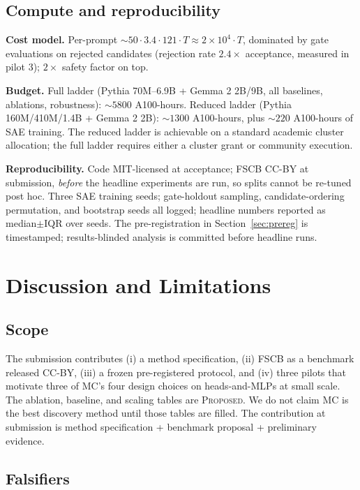 \documentclass[10pt]{article}
\begin{document}
\subsection{Compute and reproducibility}

\textbf{Cost model.} Per-prompt $\sim 50 \cdot 3.4 \cdot 121 \cdot T \approx 2 \times 10^4 \cdot T$, dominated by gate evaluations on rejected candidates (rejection rate $2.4\times$ acceptance, measured in pilot 3); $2\times$ safety factor on top.

\textbf{Budget.} Full ladder (Pythia 70M--6.9B + Gemma 2 2B/9B, all baselines, ablations, robustness): $\sim 5800$ A100-hours. Reduced ladder (Pythia 160M/410M/1.4B + Gemma 2 2B): $\sim 1300$ A100-hours, plus $\sim 220$ A100-hours of SAE training. The reduced ladder is achievable on a standard academic cluster allocation; the full ladder requires either a cluster grant or community execution.

\textbf{Reproducibility.} Code MIT-licensed at acceptance; FSCB CC-BY at submission, \emph{before} the headline experiments are run, so splits cannot be re-tuned post hoc. Three SAE training seeds; gate-holdout sampling, candidate-ordering permutation, and bootstrap seeds all logged; headline numbers reported as median$\pm$IQR over seeds. The pre-registration in Section~\ref{sec:prereg} is timestamped; results-blinded analysis is committed before headline runs.

\section{Discussion and Limitations}
\label{sec:discussion}

\subsection{Scope}

The submission contributes (i) a method specification, (ii) FSCB as a benchmark released CC-BY, (iii) a frozen pre-registered protocol, and (iv) three pilots that motivate three of MC's four design choices on heads-and-MLPs at small scale. The ablation, baseline, and scaling tables are \textsc{Proposed}. We do not claim MC is the best discovery method until those tables are filled. The contribution at submission is method specification + benchmark proposal + preliminary evidence.

\subsection{Falsifiers}
\end{document}
